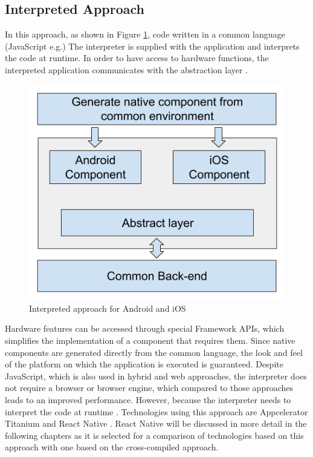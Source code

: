 \documentclass[Bachelor,BIF,english]{twbook}
\begin{document}
\subsection{Interpreted Approach}
In this approach, as shown in Figure \ref{Fig3}, code written in a common language (JavaScript e.g.) 
The interpreter is supplied with the application and interprets the code at runtime. In order to have access to hardware functions, the interpreted application communicates with the abstraction layer \cite[p.~3]{7479278} \cite[p.~2]{7934674}.
\begin{figure}[!htbp]
\centering
\includegraphics[width=0.5\linewidth]{PICs/Interpreted.png}
\caption{Interpreted approach for Android and iOS \cite[p.~3]{7479278}}\label{Fig3}
\end{figure}
Hardware features can be accessed through special Framework APIs, which simplifies the implementation of a component that requires them. Since native components are generated directly from the common language, the look and feel of the platform on which the application is executed is guaranteed. Despite JavaScript, which is also used in hybrid and web approaches, the interpreter does not require a browser or browser engine, which compared to those approaches leads to an improved performance. However, 
because the interpreter needs to interpret the code at runtime \cite[p.~627]{6420693} \cite[p.~3]{7479278}. Technologies using this approach are Appcelerator Titanium and React Native \cite[p.~2]{7934674} \cite[p.~3]{JohanssonSderberg2018}. React Native will be discussed in more detail in the following chapters as it is selected for a comparison of technologies based on this approach with one based on the cross-compiled approach.
\end{document}
